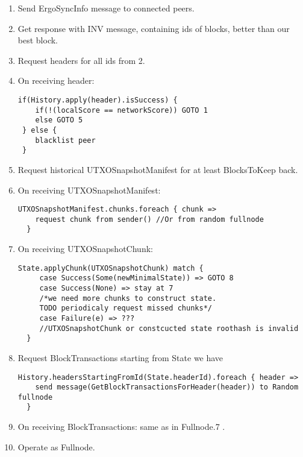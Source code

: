 \documentclass[]{report}   %
\begin{document}
\begin{enumerate}
\item Send ErgoSyncInfo message to connected peers.
\item Get response with INV message, containing ids of blocks, better than our best block.
\item Request headers for all ids from 2.
\item On receiving header:
\begin{verbatim}
if(History.apply(header).isSuccess) {
    if(!(localScore == networkScore)) GOTO 1
    else GOTO 5
 } else {
    blacklist peer
 }
\end{verbatim}
\item Request historical UTXOSnapshotManifest for at least BlocksToKeep back.
\item On receiving UTXOSnapshotManifest:
\begin{verbatim}
UTXOSnapshotManifest.chunks.foreach { chunk => 
    request chunk from sender() //Or from random fullnode
  }
\end{verbatim}
\item On receiving UTXOSnapshotChunk:
\begin{verbatim}
State.applyChunk(UTXOSnapshotChunk) match {
     case Success(Some(newMinimalState)) => GOTO 8
     case Success(None) => stay at 7 
     /*we need more chunks to construct state. 
     TODO periodicaly request missed chunks*/
     case Failure(e) => ???
     //UTXOSnapshotChunk or constcucted state roothash is invalid  
  }
\end{verbatim}
\item Request BlockTransactions starting from State we have
\begin{verbatim}
History.headersStartingFromId(State.headerId).foreach { header => 
    send message(GetBlockTransactionsForHeader(header)) to Random fullnode
  }
\end{verbatim}
\item On receiving BlockTransactions: same as in Fullnode.7 .
\item Operate as Fullnode.


\end{enumerate}
\end{document}

